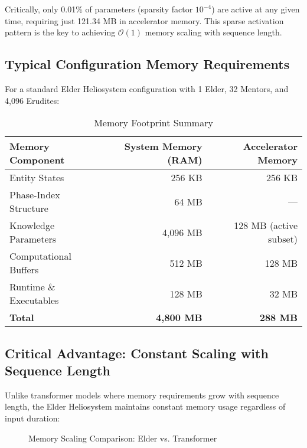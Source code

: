 Critically, only 0.01\% of parameters (sparsity factor $10^{-4}$) are active at any given time, requiring just 121.34 MB in accelerator memory. This sparse activation pattern is the key to achieving $\mathcal{O}(1)$ memory scaling with sequence length.

\subsection{Typical Configuration Memory Requirements}

For a standard Elder Heliosystem configuration with 1 Elder, 32 Mentors, and 4,096 Erudites:

\begin{table}[h]
\centering
\begin{tabular}{|l|r|r|}
\hline
\textbf{Memory Component} & \textbf{System Memory (RAM)} & \textbf{Accelerator Memory} \\
\hline
Entity States & 256 KB & 256 KB \\
Phase-Index Structure & 64 MB & --- \\
Knowledge Parameters & 4,096 MB & 128 MB (active subset) \\
Computational Buffers & 512 MB & 128 MB \\
Runtime \& Executables & 128 MB & 32 MB \\
\hline
\textbf{Total} & \textbf{4,800 MB} & \textbf{288 MB} \\
\hline
\end{tabular}
\caption{Memory Footprint Summary}
\end{table}

\subsection{Critical Advantage: Constant Scaling with Sequence Length}

Unlike transformer models where memory requirements grow with sequence length, the Elder Heliosystem maintains constant memory usage regardless of input duration:

\begin{figure}[h]
\centering
{}
\caption{Memory Scaling Comparison: Elder vs. Transformer}
\end{figure}

